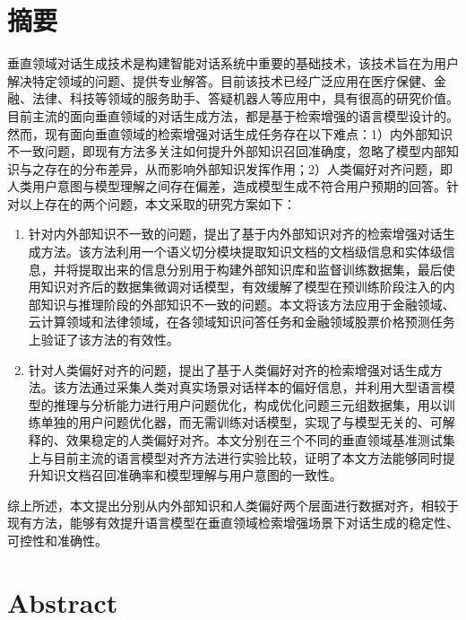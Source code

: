 \chapter{摘\texorpdfstring{\quad}{}要}

垂直领域对话生成技术是构建智能对话系统中重要的基础技术，该技术旨在为用户解决特定领域的问题、提供专业解答。目前该技术已经广泛应用在医疗保健、金融、法律、科技等领域的服务助手、答疑机器人等应用中，具有很高的研究价值。目前主流的面向垂直领域的对话生成方法，都是基于检索增强的语言模型设计的。然而，现有面向垂直领域的检索增强对话生成任务存在以下难点：1）内外部知识不一致问题，即现有方法多关注如何提升外部知识召回准确度，忽略了模型内部知识与之存在的分布差异，从而影响外部知识发挥作用；2）人类偏好对齐问题，即人类用户意图与模型理解之间存在偏差，造成模型生成不符合用户预期的回答。针对以上存在的两个问题，本文采取的研究方案如下：

\begin{enumerate}[topsep = 0 pt, itemsep= 0 pt, parsep=0pt, partopsep=0pt, leftmargin=0pt, itemindent=44pt, labelsep=6pt, listparindent=24pt, label=\arabic*)]
	\item 针对内外部知识不一致的问题，提出了基于内外部知识对齐的检索增强对话生成方法。该方法利用一个语义切分模块提取知识文档的文档级信息和实体级信息，并将提取出来的信息分别用于构建外部知识库和监督训练数据集，最后使用知识对齐后的数据集微调对话模型，有效缓解了模型在预训练阶段注入的内部知识与推理阶段的外部知识不一致的问题。本文将该方法应用于金融领域、云计算领域和法律领域，在各领域知识问答任务和金融领域股票价格预测任务上验证了该方法的有效性。

	\item 针对人类偏好对齐的问题，提出了基于人类偏好对齐的检索增强对话生成方法。该方法通过采集人类对真实场景对话样本的偏好信息，并利用大型语言模型的推理与分析能力进行用户问题优化，构成优化问题三元组数据集，用以训练单独的用户问题优化器，而无需训练对话模型，实现了与模型无关的、可解释的、效果稳定的人类偏好对齐。本文分别在三个不同的垂直领域基准测试集上与目前主流的语言模型对齐方法进行实验比较，证明了本文方法能够同时提升知识文档召回准确率和模型理解与用户意图的一致性。
\end{enumerate}

综上所述，本文提出分别从内外部知识和人类偏好两个层面进行数据对齐，相较于现有方法，能够有效提升语言模型在垂直领域检索增强场景下对话生成的稳定性、可控性和准确性。


\chapter{Abstract}

